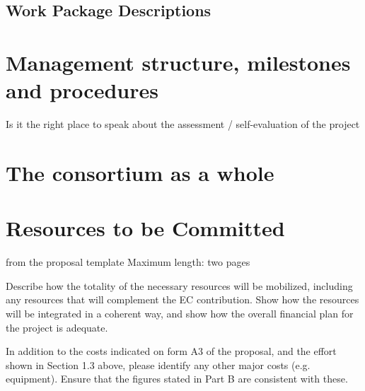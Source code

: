 \wpfigstyle{\footnotesize}

\newpage
\newpage

\subsection{Work Package Descriptions}\label{sec:workpackages}
\begin{workplan}
  \newpage
  \newpage
  \newpage
  \newpage
  \newpage
  \newpage
  \newpage
  \newpage
  \newpage
  \newpage
\end{workplan}
\ganttchart[draft,xscale=.45] 
\newpage\newpage

\section{Management structure, milestones and procedures}

{\color{red} Is it the right place to speak about the assessment /
  self-evaluation of the project}



\section{The {\protect\pn} consortium as a whole}\label{sec:consortium}


\section{Resources to be Committed}\label{sec:resources}
\begin{todo}{from the proposal template}
Maximum length: two pages

Describe how the totality of the necessary resources will be mobilized, including any resources that
will complement the EC contribution. Show how the resources will be integrated in a coherent way,
and show how the overall financial plan for the project is adequate.

In addition to the costs indicated on form A3 of the proposal, and the effort shown in Section 1.3
above, please identify any other major costs (e.g. equipment). Ensure that the figures stated in Part B
are consistent with these.
\end{todo}


